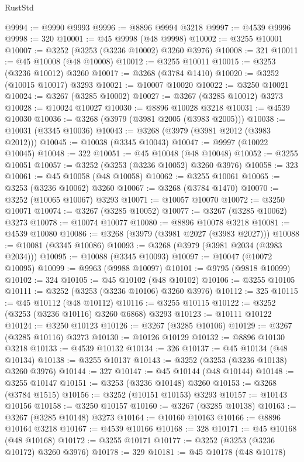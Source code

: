 \begin{lexlean}{RustStd}
\begin{coremodule}
{\begin{coremodule}
{{{{{{{{{{{{{{{{{{{{{{{{{{{{{{{{{{{{{{{@9994 := @9990 @9993
@9996 := @8896 @9994 @3218
@9997 := @4539 @9996
@9998 := 320
@10001 := @45 @9998 (@48 @9998)
@10002 := @3255 @10001
@10007 := @3252 (@3253 (@3236 @10002) @3260 @3976)
@10008 := 321
@10011 := @45 @10008 (@48 @10008)
@10012 := @3255 @10011
@10015 := @3253 (@3236 @10012) @3260
@10017 := @3268 (@3784 @1410)
@10020 := @3252 (@10015 @10017) @3293
@10021 := @10007 @10020
@10022 := @3250 @10021
@10024 := @3267 (@3285 @10002)
@10027 := @3267 (@3285 @10012) @3273
@10028 := @10024 @10027
@10030 := @8896 @10028 @3218
@10031 := @4539 @10030
@10036 := @3268 (@3979 (@3981 @2005 (@3983 @2005)))
@10038 := @10031 (@3345 @10036)
@10043 := @3268 (@3979 (@3981 @2012 (@3983 @2012)))
@10045 := @10038 (@3345 @10043)
@10047 := @9997 (@10022 @10045)
@10048 := 322
@10051 := @45 @10048 (@48 @10048)
@10052 := @3255 @10051
@10057 := @3252 (@3253 (@3236 @10052) @3260 @3976)
@10058 := 323
@10061 := @45 @10058 (@48 @10058)
@10062 := @3255 @10061
@10065 := @3253 (@3236 @10062) @3260
@10067 := @3268 (@3784 @1470)
@10070 := @3252 (@10065 @10067) @3293
@10071 := @10057 @10070
@10072 := @3250 @10071
@10074 := @3267 (@3285 @10052)
@10077 := @3267 (@3285 @10062) @3273
@10078 := @10074 @10077
@10080 := @8896 @10078 @3218
@10081 := @4539 @10080
@10086 := @3268 (@3979 (@3981 @2027 (@3983 @2027)))
@10088 := @10081 (@3345 @10086)
@10093 := @3268 (@3979 (@3981 @2034 (@3983 @2034)))
@10095 := @10088 (@3345 @10093)
@10097 := @10047 (@10072 @10095)
@10099 := @9963 (@9988 @10097)
@10101 := @9795 (@9818 @10099)
@10102 := 324
@10105 := @45 @10102 (@48 @10102)
@10106 := @3255 @10105
@10111 := @3252 (@3253 (@3236 @10106) @3260 @3976)
@10112 := 325
@10115 := @45 @10112 (@48 @10112)
@10116 := @3255 @10115
@10122 := @3252 (@3253 (@3236 @10116) @3260 @6868) @3293
@10123 := @10111 @10122
@10124 := @3250 @10123
@10126 := @3267 (@3285 @10106)
@10129 := @3267 (@3285 @10116) @3273
@10130 := @10126 @10129
@10132 := @8896 @10130 @3218
@10133 := @4539 @10132
@10134 := 326
@10137 := @45 @10134 (@48 @10134)
@10138 := @3255 @10137
@10143 := @3252 (@3253 (@3236 @10138) @3260 @3976)
@10144 := 327
@10147 := @45 @10144 (@48 @10144)
@10148 := @3255 @10147
@10151 := @3253 (@3236 @10148) @3260
@10153 := @3268 (@3784 @1515)
@10156 := @3252 (@10151 @10153) @3293
@10157 := @10143 @10156
@10158 := @3250 @10157
@10160 := @3267 (@3285 @10138)
@10163 := @3267 (@3285 @10148) @3273
@10164 := @10160 @10163
@10166 := @8896 @10164 @3218
@10167 := @4539 @10166
@10168 := 328
@10171 := @45 @10168 (@48 @10168)
@10172 := @3255 @10171
@10177 := @3252 (@3253 (@3236 @10172) @3260 @3976)
@10178 := 329
@10181 := @45 @10178 (@48 @10178)
}}}}}}}}}}}}}}}}}}}}}}}}}}}}}}}}}}}}}}}
\end{coremodule}}
\end{coremodule}
\end{lexlean}
